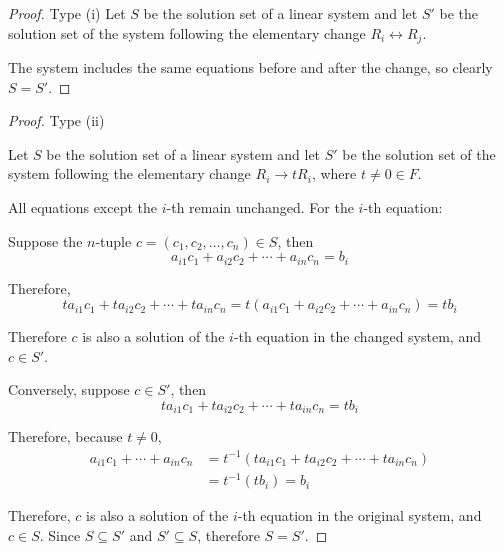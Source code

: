 \begin{proof} Type (i)
Let $S$ be the solution set of a linear system and let $S'$ be the solution set of the system following the elementary change $R_i \leftrightarrow R_j$.

The system includes the same equations before and after the change, so clearly $S = S'$.
\end{proof}
\begin{proof} Type (ii)

Let $S$ be the solution set of a linear system and let $S'$ be the solution set of the system following the elementary change $R_i \to tR_i$, where $t \neq 0 \in F$.

All equations except the $i$-th remain unchanged. For the $i$-th equation:

Suppose the $n$-tuple $c = (c_1, c_2, \ldots, c_n) \in S$, then
\[a_{i1}c_1 + a_{i2}c_2 + \cdots + a_{in}c_n = b_i\]

Therefore,
\[ta_{i1}c_1 + ta_{i2}c_2 + \cdots + ta_{in}c_n = t(a_{i1}c_1 + a_{i2}c_2 + \cdots + a_{in}c_n) = tb_i\]

Therefore $c$ is also a solution of the $i$-th equation in the changed system, and $c \in S'$.

Conversely, suppose $c \in S'$, then
\[ta_{i1}c_1 + ta_{i2}c_2 + \cdots + ta_{in}c_n = tb_i\]

Therefore, because $t \neq 0$,
\begin{align*}
a_{i1}c_1 + \cdots + a_{in}c_n &= t^{-1}(ta_{i1}c_1 + ta_{i2}c_2 + \cdots + ta_{in}c_n)\\
&= t^{-1}(tb_i)= b_i
\end{align*}

Therefore, $c$ is also a solution of the $i$-th equation in the original system, and $c \in S$.
Since $S \subseteq S'$ and $S' \subseteq S$, therefore $S = S'$.
\end{proof}
